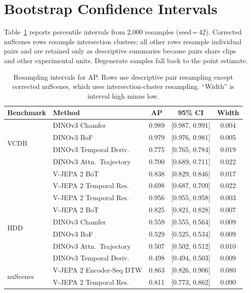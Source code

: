 \documentclass{article}
\theoremstyle{remark}
\begin{document}
\section{Bootstrap Confidence Intervals}
\label{sec:bootstrap_cis}

Table~\ref{tab:bootstrap} reports percentile intervals from 2{,}000 resamples (seed\,=\,42). Corrected nuScenes rows resample intersection clusters; all other rows resample individual pairs and are retained only as descriptive summaries because pairs share clips and other experimental units. Degenerate samples fall back to the point estimate.

\begin{table}[h]
\centering
\caption{Resampling intervals for AP. Rows use descriptive pair resampling except corrected nuScenes, which uses intersection-cluster resampling. ``Width'' is interval high minus low.}
\label{tab:bootstrap}
\begin{tabular}{llccc}
\toprule
\textbf{Benchmark} & \textbf{Method} & \textbf{AP} & \textbf{95\% CI} & \textbf{Width} \\
\midrule
\multirow{4}{*}{VCDB}
 & DINOv3 Chamfer           & 0.989 & [0.987, 0.991] & 0.004 \\
 & DINOv3 BoF               & 0.979 & [0.976, 0.981] & 0.005 \\
 & DINOv3 Temporal Deriv.   & 0.775 & [0.765, 0.784] & 0.019 \\
 & DINOv3 Attn.\ Trajectory & 0.700 & [0.689, 0.711] & 0.022 \\
 & V-JEPA 2 BoT             & 0.838 & [0.829, 0.846] & 0.017 \\
 & V-JEPA 2 Temporal Res.   & 0.698 & [0.687, 0.709] & 0.022 \\
\midrule
\multirow{6}{*}{HDD}
 & V-JEPA 2 Temporal Res.   & 0.956 & [0.955, 0.958] & 0.003 \\
 & V-JEPA 2 BoT             & 0.825 & [0.821, 0.828] & 0.007 \\
 & DINOv3 Chamfer           & 0.559 & [0.555, 0.564] & 0.009 \\
 & DINOv3 BoF               & 0.529 & [0.525, 0.534] & 0.009 \\
 & DINOv3 Attn.\ Trajectory & 0.507 & [0.502, 0.512] & 0.010 \\
 & DINOv3 Temporal Deriv.   & 0.498 & [0.494, 0.503] & 0.009 \\
\midrule
\multirow{7}{*}{nuScenes}
 & V-JEPA 2 Encoder-Seq DTW & 0.863 & [0.826, 0.906] & 0.080 \\
 & V-JEPA 2 Temporal Res.   & 0.811 & [0.773, 0.862] & 0.090 \\

\end{tabular}
\end{table}
\end{document}
